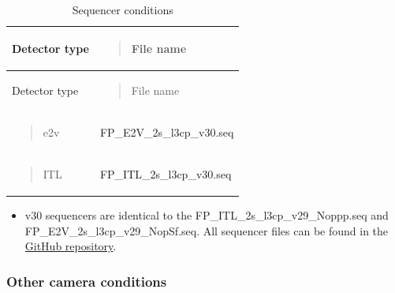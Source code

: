 \begin{longtable}[]{@{}
  >{\raggedright\arraybackslash}p{}
  >{\raggedright\arraybackslash}p{}@{}}
\caption{Sequencer conditions}\tabularnewline
\toprule\noalign{}
\begin{minipage}[b]{\linewidth}\raggedright
Detector type
\end{minipage} & \begin{minipage}[b]{\linewidth}\raggedright
\begin{quote}
File name
\end{quote}
\end{minipage} \\
\midrule\noalign{}
\endfirsthead
\toprule\noalign{}
\begin{minipage}[b]{\linewidth}\raggedright
Detector type
\end{minipage} & \begin{minipage}[b]{\linewidth}\raggedright
\begin{quote}
File name
\end{quote}
\end{minipage} \\
\midrule\noalign{}
\endhead
\bottomrule\noalign{}
\endlastfoot
\begin{minipage}[t]{\linewidth}\raggedright
\begin{quote}
e2v
\end{quote}
\end{minipage} &
FP\_E2V\_2s\_l3cp\_v30.seq \\
\begin{minipage}[t]{\linewidth}\raggedright
\begin{quote}
ITL
\end{quote}
\end{minipage} &
FP\_ITL\_2s\_l3cp\_v30.seq \\
\end{longtable}

\begin{itemize}
\tightlist
\item
  v30 sequencers are identical to the
  FP\_ITL\_2s\_l3cp\_v29\_Noppp.seq
  and
  FP\_E2V\_2s\_l3cp\_v29\_NopSf.seq.
  All sequencer files can be found in the \href{https://github.com/lsst-camera-dh/sequencer-files/tree/master/run7}{GitHub
  repository}.
\end{itemize}

\subsubsection{Other camera conditions}\label{other-camera-conditions}

